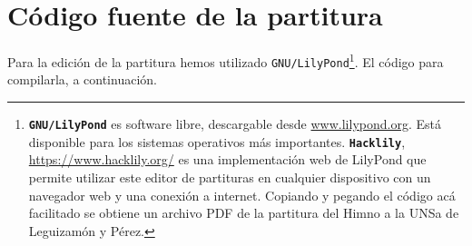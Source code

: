 \chapter{Código fuente de la partitura}
\label{cap:codigo}

Para la edición de la partitura hemos utilizado \texttt{GNU/LilyPond}\footnote{\texttt{\textbf{GNU/LilyPond}} es software libre, descargable desde \url{www.lilypond.org}. Está disponible para los sistemas operativos más importantes. \texttt{\textbf{Hacklily}}, \url{https://www.hacklily.org/} es una implementación web de LilyPond que permite utilizar este editor de partituras en cualquier dispositivo con un navegador web y una conexión a internet. Copiando y pegando el código acá facilitado se obtiene un archivo PDF de la partitura del Himno a la UNSa de Leguizamón y Pérez.}. El código para compilarla, a continuación.


